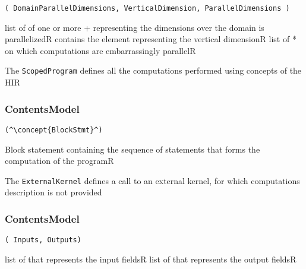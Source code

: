 \begin{lstlisting}[style=default,frame=none]
( DomainParallelDimensions, VerticalDimension, ParallelDimensions )
\end{lstlisting}

\begin{HIRChildElements}
	{list of of one or more + representing the dimensions 
	 over the domain is parallelized}{R}
	{contains the  element representing the vertical 
	 dimension}{R}
	{list of * on which computations are embarrassingly 
	 parallel}{R}
\end{HIRChildElements}


The {\tt ScopedProgram} defines all the computations performed using concepts of the HIR

\subsubsection*{ContentsModel}{}

\begin{lstlisting}[style=default,frame=none]
(^\concept{BlockStmt}^)
\end{lstlisting}

\begin{HIRChildElements}
	{Block statement containing the sequence of statements that forms the computation of the program}{R}
\end{HIRChildElements}


The {\tt ExternalKernel} defines a call to an external kernel, for which computations description is not provided

\subsubsection*{ContentsModel}{}

\begin{lstlisting}[style=default,frame=none]
( Inputs, Outputs)
\end{lstlisting}

\begin{HIRChildElements}
	{list of  that represents the input fields}{R}
	{list of  that represents the output fields}{R}
\end{HIRChildElements}

